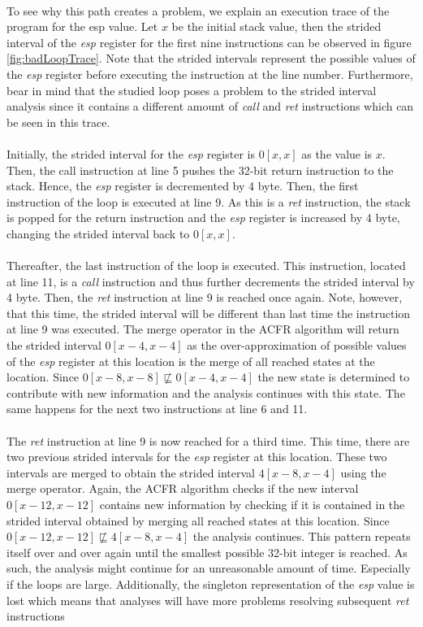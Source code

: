 \documentclass{kththesis}
\renewcommand{\it}[1]{\textit{#1}}
\begin{document}
\noindent
\\
To see why this path creates a problem, we explain an execution trace of the program for the esp value. Let $x$ be the initial stack value, then the strided interval of the \it{esp} register for the first nine instructions can be observed in figure \ref{fig:badLoopTrace}. Note that the strided intervals represent the possible values of the \it{esp} register before executing the instruction at the line number. Furthermore, bear in mind that the studied loop poses a problem to the strided interval analysis since it contains a different amount of \it{call} and \it{ret} instructions which can be seen in this trace.
\\ \\
Initially, the strided interval for the \it{esp} register is $0[x,x]$ as the value is $x$. Then, the call instruction at line 5 pushes the 32-bit return instruction to the stack. Hence, the \it{esp} register is decremented by 4 byte. Then, the first instruction of the loop is executed at line 9. As this is a \it{ret} instruction, the stack is popped for the return instruction and the \it{esp} register is increased by 4 byte, changing the strided interval back to $0[x,x]$. 
\\ \\
Thereafter, the last instruction of the loop is executed. This instruction, located at line 11, is a \it{call} instruction and thus further decrements the strided interval by 4 byte. Then, the \it{ret} instruction at line 9 is reached once again. Note, however, that this time, the strided interval will be different than last time the instruction at line 9 was executed. The merge operator in the ACFR algorithm will return the strided interval $0[x-4,x-4]$ as the over-approximation of possible values of the \it{esp} register at this location is the merge of all reached states at the location. Since $0[x-8,x-8] \nsqsubseteq 0[x-4,x-4]$ the new state is determined to contribute with new information and the analysis continues with this state. The same happens for the next two instructions at line 6 and 11.
\\ \\
The \it{ret} instruction at line 9 is now reached for a third time. This time, there are two previous strided intervals for the \it{esp} register at this location. These two intervals are merged to obtain the strided interval $4[x-8,x-4]$ using the merge operator. Again, the ACFR algorithm checks if the new interval $0[x-12,x-12]$ contains new information by checking if it is contained in the strided interval obtained by merging all reached states at this location. Since $0[x-12,x-12] \nsqsubseteq 4[x-8,x-4]$ the analysis continues.
\clearpage
\noindent
This pattern repeats itself over and over again until the smallest possible 32-bit integer is reached. As such, the analysis might continue for an unreasonable amount of time. Especially if the loops are large. Additionally, the singleton representation of the \it{esp} value is lost which means that analyses will have more problems resolving subsequent \it{ret} instructions
\end{document}
